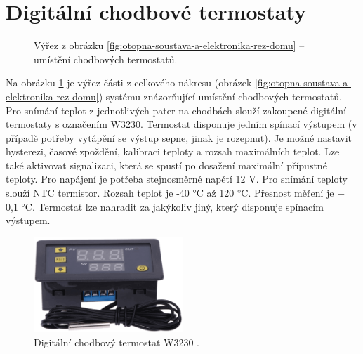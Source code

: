 \section{Digitální chodbové termostaty}
\label{sec:digitalni-chodbove-termostaty}
\begin{figure}[H]
   \centering
   \def\svgwidth{0.4\columnwidth}
   
    \caption[Výřez pro umístění chodbových termostatů.]{Výřez z obrázku \ref{fig:otopna-soustava-a-elektronika-rez-domu} – umístění chodbových termostatů.}
    \label{fig:vyrez-lokalni-termostaty}
\end{figure}

Na obrázku \ref{fig:vyrez-lokalni-termostaty} je výřez části z celkového nákresu (obrázek \ref{fig:otopna-soustava-a-elektronika-rez-domu}) systému znázorňující umístění chodbových termostatů. Pro snímání teplot z jednotlivých pater na chodbách slouží zakoupené digitální termostaty s označením W3230. Termostat disponuje jedním spínací výstupem (v případě potřeby vytápění se výstup sepne, jinak je rozepnut). Je možné nastavit hysterezi, časové zpoždění, kalibraci teploty a rozsah maximálních teplot. Lze také aktivovat signalizaci, která se spustí po dosažení maximální přípustné teploty. Pro napájení je potřeba stejnosměrné napětí 12 V. Pro snímání teploty slouží NTC termistor. Rozsah teplot je -40 °C až 120 °C. Přesnost měření je $\pm$ 0,1 °C. Termostat lze nahradit za jakýkoliv jiný, který disponuje spínacím výstupem.


\begin{figure}[H]
    \centering
    \includegraphics[width=0.5\textwidth]{images/digitalni-termostat-w3230.png}
    \caption[Digitální chodbový termostat W3230.]{Digitální chodbový termostat W3230 \cite{digitalni-termostat-w3230}.}
    \label{fig:digitalni-termostat-w3230}
\end{figure}